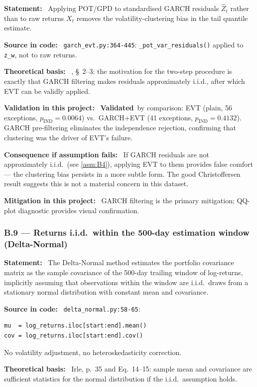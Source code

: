 \documentclass[11pt,a4paper]{article}
\newcommand{\asmfield}[1]{\medskip\noindent\textbf{#1:}\ }
\newcommand{\code}[1]{\texttt{#1}}
\newcommand{\validated}{\textbf{Validated}}
\begin{document}
\asmfield{Statement}
Applying POT/GPD to standardised GARCH residuals $\hat{Z}_t$ rather than
to raw returns $X_t$ removes the volatility-clustering bias in the tail
quantile estimate.

\asmfield{Source in code}
\code{garch\_evt.py:364-445}: \code{\_pot\_var\_residuals()} applied to
\code{z\_w}, not to raw returns.

\asmfield{Theoretical basis}
\cite{McNeilFrey2000}, \S~2--3: the motivation for the two-step procedure
is exactly that GARCH filtering makes residuals approximately i.i.d., after
which EVT can be validly applied.

\asmfield{Validation in this project}
\validated\ by comparison: EVT (plain, 56 exceptions, $p_{\mathrm{IND}} =
0.0064$) vs.\ GARCH+EVT (41 exceptions, $p_{\mathrm{IND}} = 0.4132$).
GARCH pre-filtering eliminates the independence rejection, confirming that
clustering was the driver of EVT's failure.

\asmfield{Consequence if assumption fails}
If GARCH residuals are not approximately i.i.d.\ (see \cref{asm:B4}),
applying EVT to them provides false comfort --- the clustering bias
persists in a more subtle form. The good Christoffersen result suggests
this is not a material concern in this dataset.

\asmfield{Mitigation in this project}
GARCH filtering is the primary mitigation; QQ-plot diagnostic provides
visual confirmation.

\subsubsection{B.9 --- Returns i.i.d.\ within the 500-day estimation window (Delta-Normal)}\label{asm:B9}

\asmfield{Statement}
The Delta-Normal method estimates the portfolio covariance matrix as the
sample covariance of the 500-day trailing window of log-returns, implicitly
assuming that observations within the window are i.i.d.\ draws from a
stationary normal distribution with constant mean and covariance.

\asmfield{Source in code}
\code{delta\_normal.py:58-65}:
\begin{lstlisting}
mu  = log_returns.iloc[start:end].mean()
cov = log_returns.iloc[start:end].cov()
\end{lstlisting}
No volatility adjustment, no heteroskedasticity correction.

\asmfield{Theoretical basis}
Irle, p.~35 and Eq.~14--15: sample mean and covariance are sufficient
statistics for the normal distribution if the i.i.d.\ assumption holds.
\end{document}
